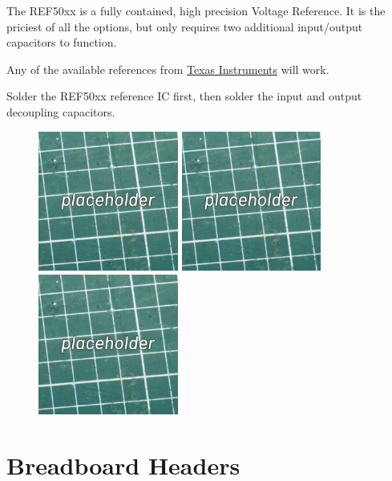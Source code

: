 \documentclass[12pt, a4paper]{article}
\begin{document}
The REF50xx is a fully contained, high precision Voltage Reference. It is the priciest of all
the options, but only requires two additional input/output capacitors to function.

Any of the available references from
\href{https://www.ti.com/lit/gpn/REF5025}{Texas Instruments} will work.

Solder the REF50xx reference IC first, then solder the input and output decoupling capacitors.

\begin{figure}[H]
    \centering
    \includegraphics[width=46mm]{images/placeholder.jpg}
    \hspace{2mm}
    \includegraphics[width=46mm]{images/placeholder.jpg}
    \hspace{2mm}
    \includegraphics[width=46mm]{images/placeholder.jpg}
\end{figure}

\pagebreak
\section{Breadboard Headers}
\label{sec:breadboard_headers}
\end{document}
